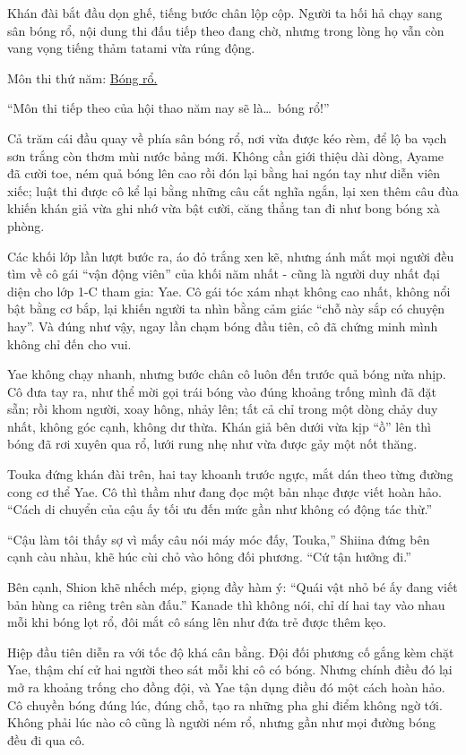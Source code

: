 \documentclass[../main.tex]{subfiles}
\begin{document}
Khán đài bắt đầu dọn ghế, tiếng bước chân lộp cộp. Người ta hối hả chạy sang sân bóng rổ, nội dung thi đấu tiếp theo đang chờ, nhưng trong lòng họ vẫn còn vang vọng tiếng thảm tatami vừa rúng động.

\begin{center}
  {\color{vol} Môn thi thứ năm: \uline{Bóng rổ.}}
\end{center}

``Môn thi tiếp theo của hội thao năm nay sẽ là\dots\ bóng rổ!''

Cả trăm cái đầu quay về phía sân bóng rổ, nơi vừa được kéo rèm, để lộ ba vạch sơn trắng còn thơm mùi nước bảng mới. Không cần giới thiệu dài dòng, Ayame đã cười toe, ném quả bóng lên cao rồi đón lại bằng hai ngón tay như diễn viên xiếc; luật thi được cô kể lại bằng những câu cắt nghĩa ngắn, lại xen thêm câu đùa khiến khán giả vừa ghi nhớ vừa bật cười, căng thẳng tan đi như bong bóng xà phòng.

Các khối lớp lần lượt bước ra, áo đỏ trắng xen kẽ, nhưng ánh mắt mọi người đều tìm về cô gái ``vận động viên'' của khối năm nhất - cũng là người duy nhất đại diện cho lớp 1-C tham gia: Yae.  Cô gái tóc xám nhạt không cao nhất, không nổi bật bằng cơ bắp, lại khiến người ta nhìn bằng cảm giác ``chỗ này sắp có chuyện hay''.  Và đúng như vậy, ngay lần chạm bóng đầu tiên, cô đã chứng minh mình không chỉ đến cho vui.

Yae không chạy nhanh, nhưng bước chân cô luôn đến trước quả bóng nửa nhịp.  Cô đưa tay ra, như thể mời gọi trái bóng vào đúng khoảng trống mình đã đặt sẵn; rồi khom người, xoay hông, nhảy lên; tất cả chỉ trong một dòng chảy duy nhất, không góc cạnh, không dư thừa.  Khán giả bên dưới vừa kịp ``ồ'' lên thì bóng đã rơi xuyên qua rổ, lưới rung nhẹ như vừa được gảy một nốt thăng.

Touka đứng khán đài trên, hai tay khoanh trước ngực, mắt dán theo từng đường cong cơ thể Yae. Cô thì thầm như đang đọc một bản nhạc được viết hoàn hảo. ``Cách di chuyển của cậu ấy tối ưu đến mức gần như không có động tác thừ.''

``Cậu làm tôi thấy sợ vì mấy câu nói máy móc đấy, Touka,'' Shiina đứng bên cạnh càu nhàu, khẽ húc cùi chỏ vào hông đối phương. ``Cứ tận hưởng đi.''

Bên cạnh, Shion khẽ nhếch mép, giọng đầy hàm ý: ``Quái vật nhỏ bé ấy đang viết bản hùng ca riêng trên sàn đấu.''  Kanade thì không nói, chỉ dí hai tay vào nhau mỗi khi bóng lọt rổ, đôi mắt cô sáng lên như đứa trẻ được thêm kẹo.

Hiệp đầu tiên diễn ra với tốc độ khá cân bằng. Đội đối phương cố gắng kèm chặt Yae, thậm chí cử hai người theo sát mỗi khi cô có bóng. Nhưng chính điều đó lại mở ra khoảng trống cho đồng đội, và Yae tận dụng điều đó một cách hoàn hảo. Cô chuyền bóng đúng lúc, đúng chỗ, tạo ra những pha ghi điểm không ngờ tới. Không phải lúc nào cô cũng là người ném rổ, nhưng gần như mọi đường bóng đều đi qua cô.
\end{document}
